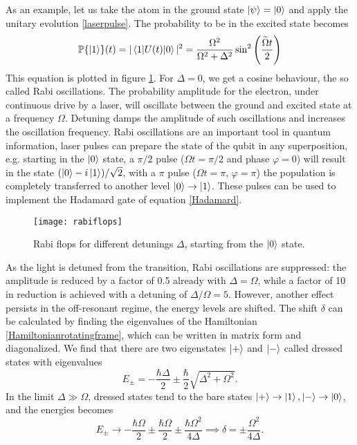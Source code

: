 As an example, let us take the atom in the ground state $\ket{\psi} = \ket{0}$ and apply the unitary evolution \eqref{laserpulse}. The probability to be in the excited state becomes
\begin{equation}
\mathbb{P}\{\ket{1}\}(t) = |\braket{1|U(t)|0}|^2 = \frac{\Omega^2}{\Omega^2+\Delta^2} \sin^2\left(\frac{\widetilde{\Omega}t}{2} \right)
\end{equation}
This equation is plotted in figure \ref{rabiflops}. For $\Delta = 0$, we get a cosine behaviour, the so called Rabi oscillations. The probability amplitude for the electron, under continuous drive by a laser, will oscillate between the ground and excited state at a frequency $\Omega$. Detuning damps the amplitude of such oscillations and increases the oscillation frequency. Rabi oscillations are an important tool in quantum information, laser pulses can prepare the state of the qubit in any superposition, e.g. starting in the $\ket{0}$ state, a $\pi/2$ pulse ($\Omega t = \pi/2$ and phase $\varphi=0$) will result in the state $(\ket{0} - i\ket{1})/\sqrt{2}$, with a $\pi$ pulse ($\Omega t = \pi$, $\varphi=\pi$) the population is completely transferred to another level $\ket{0}\to \ket{1}$. These pulses can be used to implement the Hadamard gate of equation \eqref{Hadamard}.
\begin{figure}[H]
\centering
\texttt{[image: rabiflops]}
\caption{Rabi flops for different detunings $\Delta$, starting from the $\ket{0}$ state.}
\label{rabiflops}
\end{figure}
As the light is detuned from the transition, Rabi oscillations are suppressed: the amplitude is reduced by a factor of 0.5 already with $\Delta = \Omega$, while a factor of 10 in reduction is achieved with a detuning of $\Delta/\Omega = 5$. However, another effect persists in the off-resonant regime, the energy levels are shifted.
The shift $\delta$ can be calculated by finding the eigenvalues of the Hamiltonian \eqref{Hamiltonianrotatingframe}, which can be written in matrix form and diagonalized. We find that there are two eigenstates $\ket{+}$ and $\ket{-}$ called dressed states with eigenvalues
\begin{equation}
E_{\pm} = -\frac{\hbar\Delta}{2} \pm \frac{\hbar}{2}\sqrt{\Delta^2 +\Omega^2}.
\end{equation}
In the limit $\Delta \gg \Omega$, dressed states tend to the bare states $\ket{+} \to \ket{1},\ket{-}\to \ket{0}$, and the energies becomes
\begin{equation}
\label{eq:starkshift}
E_{\pm} \to -\frac{\hbar \Omega}{2} \pm \frac{\hbar \Omega}{2} \pm \frac{\hbar \Omega^2}{4\Delta} \implies \delta = \pm\frac{\Omega^2}{4\Delta}.
\end{equation}
